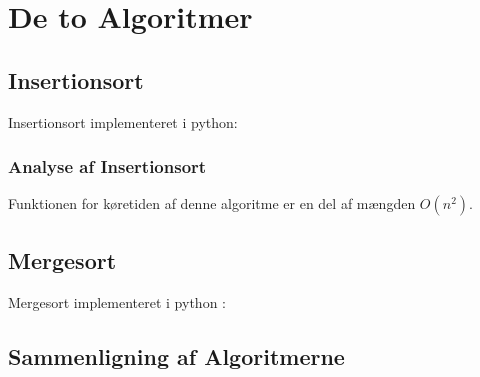 \chapter{De to Algoritmer}
\label{ch:De to Algoritmer}

\section{Insertionsort}
\label{sec:Insertionsort}

Insertionsort implementeret i python:



\subsection{Analyse af Insertionsort}
\label{sec:Analyse af Insertionsort}
Funktionen for køretiden af denne algoritme er en del af mængden $O(n^2)$.


\section{Mergesort}
\label{sec:Mergesort}

Mergesort implementeret i python \cite[s. 106]{aogd}:


\section{Sammenligning af Algoritmerne}
\label{sec:Sammenligninng af Algoritmerne}


